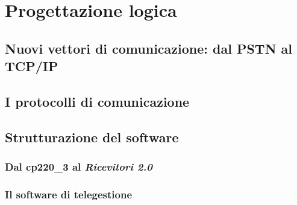 \chapter{Progettazione logica}
\label{capitolo4}
\thispagestyle{empty}
\section{Nuovi vettori di comunicazione: dal PSTN al TCP/IP}
\section{I protocolli di comunicazione}
\section{Strutturazione del software}
\subsection{Dal cp220\_3 al \emph{Ricevitori 2.0}}
\subsection{Il software di telegestione}
